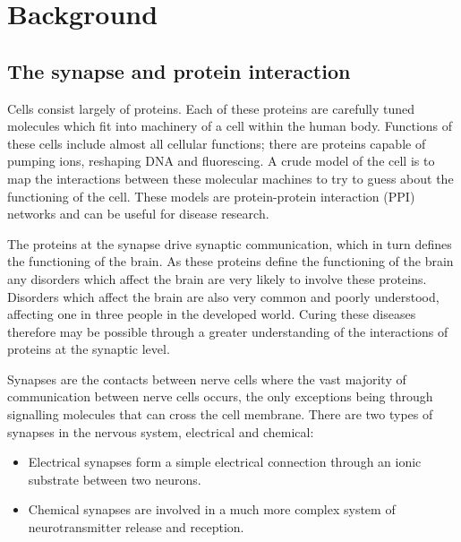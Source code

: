 \chapter{Background}
\label{background}

\lipsum[1]


\section{The synapse and protein interaction}

Cells consist largely of proteins.
Each of these proteins are carefully tuned molecules which fit into machinery of a cell within the human body.
Functions of these cells include almost all cellular functions; there are proteins capable of pumping ions, reshaping DNA and fluorescing\cite{alberts_molecular_2008}.
A crude model of the cell is to map the interactions between these molecular machines to try to guess about the functioning of the cell.
These models are protein-protein interaction (PPI) networks and can be useful for disease research.

The proteins at the synapse drive synaptic communication, which in turn defines the functioning of the brain.
As these proteins define the functioning of the brain any disorders which affect the brain are very likely to involve these proteins.
Disorders which affect the brain are also very common and poorly understood, affecting one in three people in the developed world\cite{citation_needed}.
Curing these diseases therefore may be possible through a greater understanding of the interactions of proteins at the synaptic level\cites{synsys,chua_architecture_2010}.

Synapses are the contacts between nerve cells where the vast majority of communication between nerve cells occurs, the only exceptions being through signalling molecules that can cross the cell membrane.
There are two types of synapses in the nervous system, electrical and chemical\cite{kandel_principles_2000}:

\begin{itemize}
    \item Electrical synapses form a simple electrical connection through an ionic substrate between two neurons.
    \item Chemical synapses are involved in a much more complex system of neurotransmitter release and reception.
\end{itemize}

